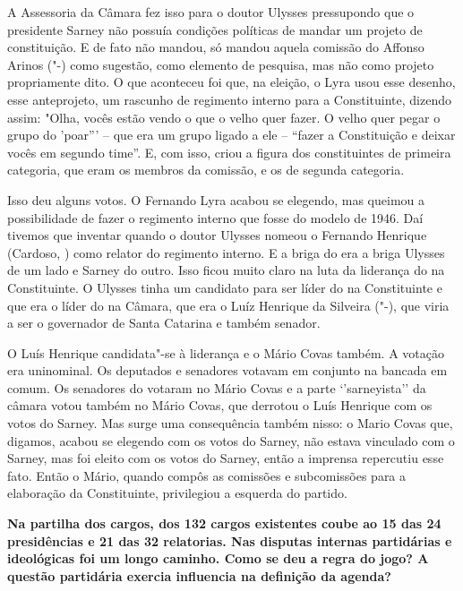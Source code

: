 A Assessoria da Câmara fez isso para o doutor Ulysses pressupondo que o
presidente Sarney não possuía condições políticas de mandar um projeto
de constituição. E de fato não mandou, só mandou aquela comissão do
Affonso Arinos ("-) como sugestão, como elemento de pesquisa, mas
não como projeto propriamente dito. O que aconteceu foi que, na eleição,
o Lyra usou esse desenho, esse anteprojeto, um rascunho de regimento
interno para a Constituinte, dizendo assim: "Olha, vocês estão vendo o
que o velho quer fazer. O velho quer pegar o grupo do 'poar''' -- que
era um grupo ligado a ele -- ``fazer a Constituição e deixar vocês em
segundo time''. E, com isso, criou a figura dos constituintes de
primeira categoria, que eram os membros da comissão, e os de segunda
categoria.

Isso deu alguns votos. O Fernando Lyra acabou se elegendo, mas queimou a
possibilidade de fazer o regimento interno que fosse do modelo de 1946.
Daí tivemos que inventar quando o doutor Ulysses nomeou o Fernando
Henrique (Cardoso, ) como relator do regimento interno. E a briga do
 era a briga Ulysses de um lado e Sarney do outro. Isso ficou muito
claro na luta da liderança do  na Constituinte. O Ulysses tinha um
candidato para ser líder do  na Constituinte e que era o líder do
 na Câmara, que era o Luíz Henrique da Silveira ("-), que viria
a ser o governador de Santa Catarina e também senador.

O Luís Henrique candidata"-se à liderança e o Mário Covas também. A
votação era uninominal. Os deputados e senadores votavam em conjunto na
bancada em comum. Os senadores do  votaram no Mário Covas e a parte
`'sarneyista'' da câmara votou também no Mário Covas, que derrotou o
Luís Henrique com os votos do Sarney. Mas surge uma consequência também
nisso: o Mario Covas que, digamos, acabou se elegendo com os votos do
Sarney, não estava vinculado com o Sarney, mas foi eleito com os votos
do Sarney, então a imprensa repercutiu esse fato. Então o Mário, quando
compôs as comissões e subcomissões para a elaboração da Constituinte,
privilegiou a esquerda do partido.

\textbf{Na partilha dos cargos, dos 132 cargos existentes coube ao 
15 das 24 presidências e 21 das 32 relatorias. Nas disputas internas
partidárias e ideológicas foi um longo caminho. Como se deu a regra do
jogo? A questão partidária exercia influencia na definição da agenda?}

